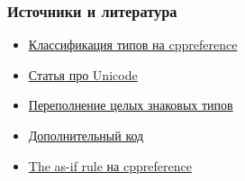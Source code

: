 \documentclass[compress, 8pt, aspectratio=169]{beamer}
\begin{document}
\begin{frame}

    \frametitle{Источники и литература}

    \begin{itemize}

        \item \href{https://en.cppreference.com/w/cpp/language/type}
            {Классификация типов на cppreference}
        \item \href{https://habr.com/ru/companies/wunderfund/articles/777850/}
            {Статья про Unicode}
        \item \href{https://github.com/Nekrolm/ubbook/blob/master/numeric/overflow.md}
            {Переполнение целых знаковых типов}
        \item \href{https://ru.wikipedia.org/wiki/\%D0\%94\%D0\%BE\%D0\%BF\%D0\%BE\%D0\%BB\%D0\%BD\%D0\%B8\%D1\%82\%D0\%B5\%D0\%BB\%D1\%8C\%D0\%BD\%D1\%8B\%D0\%B9_\%D0\%BA\%D0\%BE\%D0\%B4}
            {Дополнительный код}
        \item \href{https://en.cppreference.com/w/cpp/language/as\_if}
            {The as-if rule на cppreference}

    \end{itemize}

\end{frame}
\end{document}
